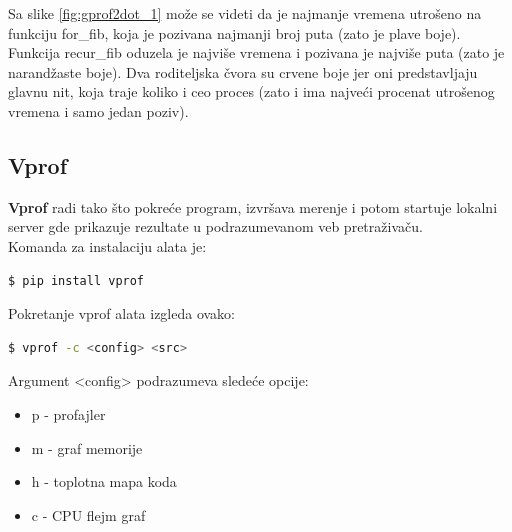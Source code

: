 \documentclass[a4paper]{article}
\begin{document}
Sa slike \ref{fig:gprof2dot_1} može se videti da je najmanje vremena utrošeno na funkciju for\_fib, koja je pozivana najmanji broj puta (zato je plave boje). Funkcija recur\_fib oduzela je najviše vremena i pozivana je najviše puta (zato je narandžaste boje). Dva roditeljska čvora su crvene boje jer oni predstavljaju glavnu nit, koja traje koliko i ceo proces (zato i ima najveći procenat utrošenog vremena i samo jedan poziv). 

\subsection{Vprof}
\label{profajler_6}
	
\textbf{Vprof} radi tako što pokreće program, izvršava merenje i potom startuje lokalni server gde prikazuje rezultate u podrazumevanom veb pretraživaču. \\
Komanda za instalaciju alata je:
\begin{lstlisting}[language=bash, belowskip=-\baselineskip]
  $ pip install vprof
\end{lstlisting}
Pokretanje vprof alata izgleda ovako:
\begin{lstlisting}[language=bash, belowskip=-\baselineskip]
  $ vprof -c <config> <src>
\end{lstlisting}
Argument <config> podrazumeva sledeće opcije:
\begin{itemize}
    \item  p - profajler
    \item  m - graf memorije
    \item  h - toplotna mapa koda
    \item  c - CPU flejm graf
\end{itemize}
\end{document}
